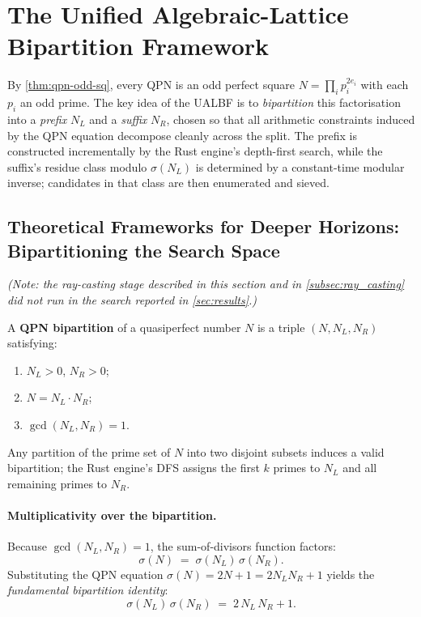 \section{The Unified Algebraic-Lattice Bipartition Framework}
\label{sec:ualbf}

By \cref{thm:qpn-odd-sq}, every QPN is an odd perfect square
$N = \prod_{i} p_i^{2e_i}$
with each $p_i$ an odd prime.  The key idea of the UALBF is to
\emph{bipartition} this factorisation into a \emph{prefix} $N_L$ and a
\emph{suffix} $N_R$, chosen so that all arithmetic constraints induced by the
QPN equation decompose cleanly across the split.  The prefix is constructed
incrementally by the Rust engine's depth-first search, while the suffix's
residue class modulo $\sigma(N_L)$ is determined by a constant-time
modular inverse; candidates in that class are then enumerated and sieved.

\subsection{Theoretical Frameworks for Deeper Horizons: Bipartitioning the Search Space}
\label{subsec:bipartition}

\emph{(Note: the ray-casting stage described in this section and in
\cref{subsec:ray_casting} did not run in the search reported in
\cref{sec:results}.)}

\begin{definition}\label{def:bipartition}
A \textbf{QPN bipartition} of a quasiperfect number $N$ is a triple
$(N, N_L, N_R)$ satisfying:
\begin{enumerate}
  \item $N_L > 0$, $N_R > 0$;
  \item $N = N_L \cdot N_R$;
  \item $\gcd(N_L, N_R) = 1$.
\end{enumerate}
Any partition of the prime set of $N$ into two disjoint subsets induces
a valid bipartition; the Rust engine's DFS assigns the first $k$ primes
to $N_L$ and all remaining primes to $N_R$.
\end{definition}

\paragraph{Multiplicativity over the bipartition.}
Because $\gcd(N_L, N_R) = 1$, the sum-of-divisors function factors:
\begin{equation}\label{eq:sigma-bipartition}
  \sigma(N) \;=\; \sigma(N_L)\,\sigma(N_R).
\end{equation}
Substituting the QPN equation $\sigma(N) = 2N + 1 = 2 N_L N_R + 1$ yields
the \emph{fundamental bipartition identity}:
\begin{equation}\label{eq:bipartition-identity}
  \sigma(N_L)\,\sigma(N_R) \;=\; 2\,N_L\,N_R + 1.
\end{equation}


